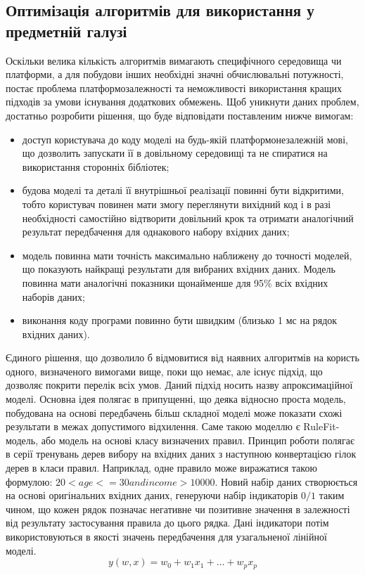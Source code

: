 \subsection{Оптимізація алгоритмів для використання у предметній галузі}
Оскільки велика кількість алгоритмів вимагають специфічного середовища чи платформи, а для побудови інших необхідні значні обчислювальні потужності, постає проблема платформозалежності та неможливості використання кращих підходів за умови існування додаткових обмежень. Щоб уникнути даних проблем, достатньо розробити рішення, що буде відповідати поставленим нижче вимогам:
\begin{itemize}  
	\item доступ користувача до коду моделі на будь-якій платформонезалежній мові, що дозволить запускати її в довільному середовищі та не спиратися на використання сторонніх бібліотек;
	\item будова моделі та деталі її внутрішньої реалізації повинні бути відкритими, тобто користувач повинен мати змогу переглянути вихідний код і в разі необхідності самостійно відтворити довільний крок та отримати аналогічний результат передбачення для однакового набору вхідних даних;
	\item модель повинна мати точність максимально наближену до точності моделей, що показують найкращі результати для вибраних вхідних даних. Модель повинна мати аналогічні показники щонайменше для 95\% всіх вхідних наборів даних;
	\item виконання коду програми повинно бути швидким (близько 1 мс на рядок вхідних даних).
\end{itemize}

Єдиного рішення, що дозволило б відмовитися від наявних алгоритмів на користь одного, визначеного вимогами вище, поки що немає, але існує підхід, що дозволяє покрити перелік всіх умов. Даний підхід носить назву апроксимаційної моделі. Основна ідея полягає в припущенні, що деяка відносно проста модель, побудована на основі передбачень більш складної моделі може показати схожі результати в межах допустимого відхилення. Саме такою моделлю є RuleFit-модель, або модель на основі класу визначених правил. Принцип роботи полягає в серії тренувань дерев вибору на вхідних даних з наступною конвертацією гілок дерев в класи правил. Наприклад, одне правило може виражатися такою формулою: $20 < age <= 30 and income > 10000$. Новий набір даних створюється на основі оригінальних вхідних даних, генеруючи набір індикаторів $0/1$ таким чином, що кожен рядок позначає негативне чи позитивне значення в залежності від результату застосування правила до цього рядка. Дані індикатори потім використовуються в якості значень передбачення для узагальненої лінійної моделі.
\begin{equation}
    \label{eq:linear_model}
    y(w, x) = w_{0} + w_{1}x_{1} + \ldots + w_{p}x_{p}
\end{equation}

